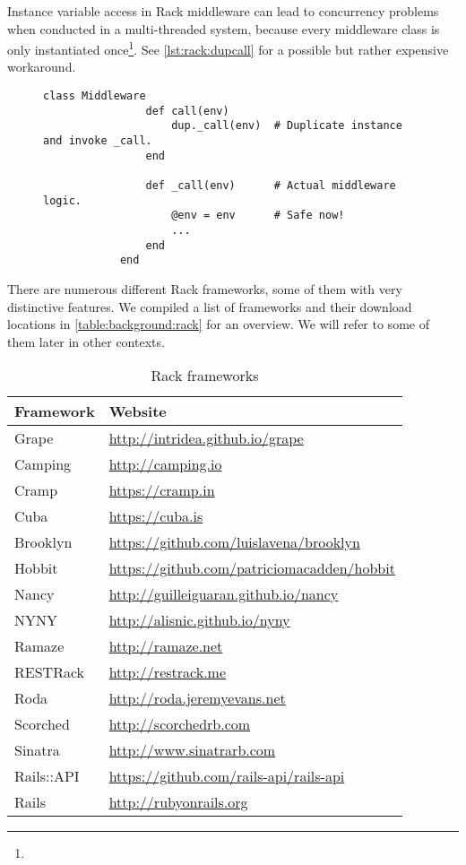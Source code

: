 	Instance variable access in Rack middleware can lead to concurrency
	problems when conducted in a multi-threaded system, because every
	middleware class is only instantiated once\footnote{\urlRackDupCall}. See
	\autoref{lst:rack:dupcall} for a possible but rather expensive workaround.

	\begin{figure}[H]
		\begin{lstlisting}[gobble=6,caption={Rack dup.\_call workaround},label=lst:rack:dupcall]
			class Middleware
				def call(env)
					dup._call(env)  # Duplicate instance and invoke _call.
				end

				def _call(env)      # Actual middleware logic.
					@env = env      # Safe now!
					...
				end
			end
		\end{lstlisting}
	\end{figure}

	There are numerous different Rack frameworks, some of them with very
	distinctive features. We compiled a list of frameworks and their download
	locations in \autoref{table:background:rack} for an overview. We will refer
	to some of them later in other contexts.

	\begin{table}[H]
		\begin{center}
			\begin{tabular}{l|l}
				Framework			& Website \\
				\hline
				Grape				& \url{http://intridea.github.io/grape} \\
				Camping				& \url{http://camping.io} \\
				Cramp				& \url{https://cramp.in} \\
				Cuba				& \url{https://cuba.is} \\
				Brooklyn			& \url{https://github.com/luislavena/brooklyn} \\
				Hobbit				& \url{https://github.com/patriciomacadden/hobbit} \\
				Nancy				& \url{http://guilleiguaran.github.io/nancy} \\
				NYNY				& \url{http://alisnic.github.io/nyny} \\
				Ramaze				& \url{http://ramaze.net} \\
				\acs{REST}Rack		& \url{http://restrack.me} \\
				Roda				& \url{http://roda.jeremyevans.net} \\
				Scorched			& \url{http://scorchedrb.com} \\
				Sinatra				& \url{http://www.sinatrarb.com} \\
				\acs{Rails}::API	& \url{https://github.com/rails-api/rails-api} \\
				\acl{Rails}			& \url{http://rubyonrails.org} \\
			\end{tabular}
		\end{center}
		\caption{Rack frameworks}
		\label{table:background:rack}
	\end{table}

